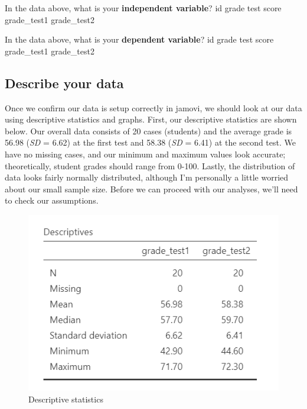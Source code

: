 \documentclass[
]{book}
\begin{document}
In the data above, what is your \textbf{independent variable}? id grade test score grade\_test1 grade\_test2

In the data above, what is your \textbf{dependent variable}? id grade test score grade\_test1 grade\_test2

\hypertarget{describe-your-data-1}{%
\subsection{Describe your data}\label{describe-your-data-1}}

Once we confirm our data is setup correctly in jamovi, we should look at our data using descriptive statistics and graphs. First, our descriptive statistics are shown below. Our overall data consists of 20 cases (students) and the average grade is 56.98 (\emph{SD} = 6.62) at the first test and 58.38 (\emph{SD} = 6.41) at the second test. We have no missing cases, and our minimum and maximum values look accurate; theoretically, student grades should range from 0-100. Lastly, the distribution of data looks fairly normally distributed, although I'm personally a little worried about our small sample size. Before we can proceed with our analyses, we'll need to check our assumptions.

\begin{figure}

{\centering \includegraphics[width=0.8\linewidth]{images/03_dependent_t-test/dependent_descriptives} 

}

\caption{Descriptive statistics}\label{fig:unnamed-chunk-2}
\end{figure}
\end{document}
